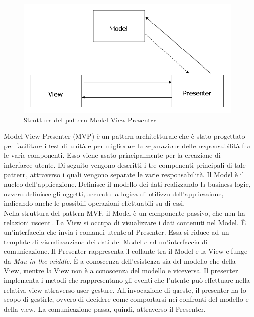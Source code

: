  	 \label{app:MVP}
	\begin{figure}[H]\centering
    \includegraphics[scale=0.5]{SpecificaTecnica/Pics/MVP}
    \caption{Struttura del pattern Model View Presenter}
	\end{figure}
	Model View Presenter (MVP) è un pattern architetturale che è stato progettato per facilitare i test di unità e per migliorare la separazione delle responsabilità fra le varie componenti. Esso viene usato principalmente per la creazione di interfacce utente.
		Di seguito vengono descritti i tre componenti principali di tale pattern, attraverso i quali vengono separate le varie responsabilità.
			Il Model è il nucleo dell'applicazione. Definisce il modello dei dati realizzando la business logic, ovvero definisce gli oggetti, secondo la logica di utilizzo dell'applicazione, indicando anche le possibili operazioni effettuabili su di essi.\\
			Nella struttura del pattern MVP, il Model è un componente passivo, che non ha relazioni uscenti.
			La View si occupa di visualizzare i dati contenuti nel Model. È un'interfaccia che invia i comandi utente al Presenter. Essa si riduce ad un template di visualizzazione dei dati del Model e ad un'interfaccia di comunicazione.
			Il Presenter rappresenta il collante tra il Model e la View e funge da \textit{Man in the middle}. È a conoscenza dell'esistenza sia del modello che della View, mentre la View non è a conoscenza del modello e viceversa. Il presenter implementa i metodi che rappresentano gli eventi che l'utente può effettuare nella relativa view attraverso user gesture. All'invocazione di queste, il presenter ha lo scopo di gestirle, ovvero di decidere come comportarsi nei confronti del modello e della view. La comunicazione passa, quindi, attraverso il Presenter.
